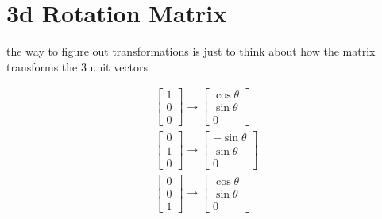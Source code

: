 \documentclass[fleqn]{report}
\newcommand{\equations} [1] {
\begin{gather*}
#1
\end{gather*}
}
\begin{document}
\section{3d Rotation Matrix}
the way to figure out transformations is just to think about how the matrix
transforms the 3 unit vectors
\equations{
\begin{bmatrix}
1 \\ 0 \\ 0 
\end{bmatrix}
\rightarrow
\begin{bmatrix}
\cos \theta \\ \sin \theta \\ 0
\end{bmatrix}
\\
\begin{bmatrix}
0 \\ 1 \\ 0
\end{bmatrix}
\rightarrow
\begin{bmatrix}
-\sin \theta \\ \sin \theta \\ 0
\end{bmatrix}
\\
\begin{bmatrix}
0 \\ 0 \\ 1
\end{bmatrix}
\rightarrow
\begin{bmatrix}
\cos \theta \\ \sin \theta \\ 0
\end{bmatrix}
}
\end{document}

